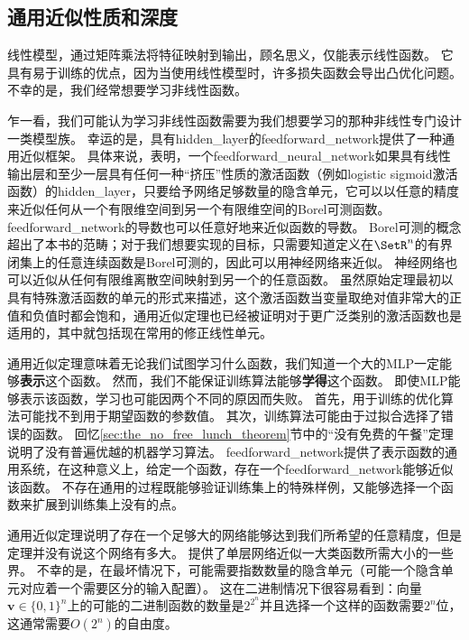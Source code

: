 \subsection{通用近似性质和深度}
\label{sec:universal_approximation_properties_and_depth}

线性模型，通过矩阵乘法将特征映射到输出，顾名思义，仅能表示线性函数。
它具有易于训练的优点，因为当使用线性模型时，许多损失函数会导出凸优化问题。
不幸的是，我们经常想要学习非线性函数。

乍一看，我们可能认为学习非线性函数需要为我们想要学习的那种非线性专门设计一类模型族。
幸运的是，具有\gls{hidden_layer}的\gls{feedforward_network}提供了一种通用近似框架。
具体来说，\citep{Hornik89,Cybenko89}表明，一个\gls{feedforward_neural_network}如果具有线性输出层和至少一层具有任何一种``挤压''性质的激活函数（例如logistic sigmoid激活函数）的\gls{hidden_layer}，只要给予网络足够数量的隐含单元，它可以以任意的精度来近似任何从一个有限维空间到另一个有限维空间的Borel可测函数。
\gls{feedforward_network}的导数也可以任意好地来近似函数的导数\citep{hornik1990universal}。
Borel可测的概念超出了本书的范畴；对于我们想要实现的目标，只需要知道定义在$\SetR^n$的有界闭集上的任意连续函数是Borel可测的，因此可以用神经网络来近似。
神经网络也可以近似从任何有限维离散空间映射到另一个的任意函数。
虽然原始定理最初以具有特殊激活函数的单元的形式来描述，这个激活函数当变量取绝对值非常大的正值和负值时都会饱和，通用近似定理也已经被证明对于更广泛类别的激活函数也是适用的，其中就包括现在常用的修正线性单元\citep{Leshno-et-al-1993}。


通用近似定理意味着无论我们试图学习什么函数，我们知道一个大的MLP一定能够\textbf{表示}这个函数。
然而，我们不能保证训练算法能够\textbf{学得}这个函数。
即使MLP能够表示该函数，学习也可能因两个不同的原因而失败。
首先，用于训练的优化算法可能找不到用于期望函数的参数值。
其次，训练算法可能由于过拟合选择了错误的函数。
回忆\ref{sec:the_no_free_lunch_theorem}节中的``没有免费的午餐''定理说明了没有普遍优越的机器学习算法。
\gls{feedforward_network}提供了表示函数的通用系统，在这种意义上，给定一个函数，存在一个\gls{feedforward_network}能够近似该函数。
不存在通用的过程既能够验证训练集上的特殊样例，又能够选择一个函数来扩展到训练集上没有的点。

通用近似定理说明了存在一个足够大的网络能够达到我们所希望的任意精度，但是定理并没有说这个网络有多大。
\cite{Barron93}提供了单层网络近似一大类函数所需大小的一些界。
不幸的是，在最坏情况下，可能需要指数数量的隐含单元（可能一个隐含单元对应着一个需要区分的输入配置）。
这在二进制情况下很容易看到：向量$\bm{v}\in \{0,1\}^n$上的可能的二进制函数的数量是$2^{2^n}$并且选择一个这样的函数需要$2^n$位，这通常需要$O(2^n)$的自由度。

